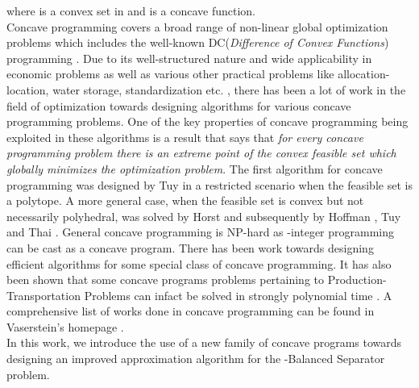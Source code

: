 \documentclass [11pt,a4paper]{article}
\begin{document}
where  is a convex set in  and  is a concave function. \\
Concave programming covers a broad range of 
non-linear global optimization problems which includes the well-known
DC(\emph{Difference of Convex Functions}) programming .
Due to its well-structured nature and wide applicability in economic problems as well as various other 
practical problems like allocation-location, water storage, standardization etc. \cite{TTT85},
there has been a lot of work in the field of optimization towards designing algorithms for various concave programming 
problems. One of the key properties of concave programming being exploited in these algorithms 
is a result that says that \emph{for every concave programming problem there is an extreme point
of the convex feasible set  which globally minimizes the optimization problem}. 
The first algorithm for concave programming was designed by Tuy \cite{T64} in a restricted scenario
when the feasible set is a polytope. A more general case, when the feasible set is convex
but not necessarily polyhedral, was solved by Horst \cite{H76} and subsequently by Hoffman \cite{H81}, Tuy and
Thai \cite{TT81}. General concave programming is NP-hard as -integer programming can
be cast as a concave program. There has been work towards designing efficient algorithms 
for some special class of concave programming. It has also been shown that some concave 
programs problems pertaining to Production-Transportation Problems can infact be solved in 
strongly polynomial time \cite{TGMV96}. A comprehensive list of works done in concave programming 
can be found in Vaserstein's homepage \cite{V}. \\
In this work, we introduce the use of a new family of concave programs towards designing
an improved approximation algorithm for the {\sc -Balanced Separator} problem. 
  
\end{document}
